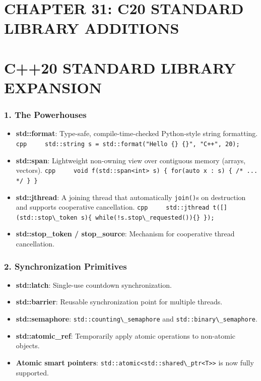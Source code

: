 \hypertarget{chapter-31-c20-standard-library-additions}{%
\section{CHAPTER 31: C20 STANDARD LIBRARY
ADDITIONS}\label{chapter-31-c20-standard-library-additions}}

\hypertarget{c20-standard-library-expansion}{%
\section{C++20 STANDARD LIBRARY
EXPANSION}\label{c20-standard-library-expansion}}

\hypertarget{the-powerhouses}{%
\subsubsection{1. The Powerhouses}\label{the-powerhouses}}

\begin{itemize}
\tightlist
\item
  \textbf{std::format}: Type-safe, compile-time-checked Python-style
  string formatting.
  \passthrough{\lstinline!cpp     std::string s = std::format("Hello \{\} \{\}", "C++", 20);!}
\item
  \textbf{std::span}: Lightweight non-owning view over contiguous memory
  (arrays, vectors).
  \passthrough{\lstinline!cpp     void f(std::span<int> s) \{ for(auto x : s) \{ /* ... */ \} \}!}
\item
  \textbf{std::jthread}: A joining thread that automatically
  \passthrough{\lstinline!join()!}s on destruction and supports
  cooperative cancellation.
  \passthrough{\lstinline"cpp     std::jthread t([](std::stop\_token s)\{ while(!s.stop\_requested())\{\} \});"}
\item
  \textbf{std::stop\_token / stop\_source}: Mechanism for cooperative
  thread cancellation.
\end{itemize}

\hypertarget{synchronization-primitives}{%
\subsubsection{2. Synchronization
Primitives}\label{synchronization-primitives}}

\begin{itemize}
\tightlist
\item
  \textbf{std::latch}: Single-use countdown synchronization.
\item
  \textbf{std::barrier}: Reusable synchronization point for multiple
  threads.
\item
  \textbf{std::semaphore}:
  \passthrough{\lstinline!std::counting\_semaphore!} and
  \passthrough{\lstinline!std::binary\_semaphore!}.
\item
  \textbf{std::atomic\_ref}: Temporarily apply atomic operations to
  non-atomic objects.
\item
  \textbf{Atomic smart pointers}:
  \passthrough{\lstinline!std::atomic<std::shared\_ptr<T>>!} is now
  fully supported.
\end{itemize}

